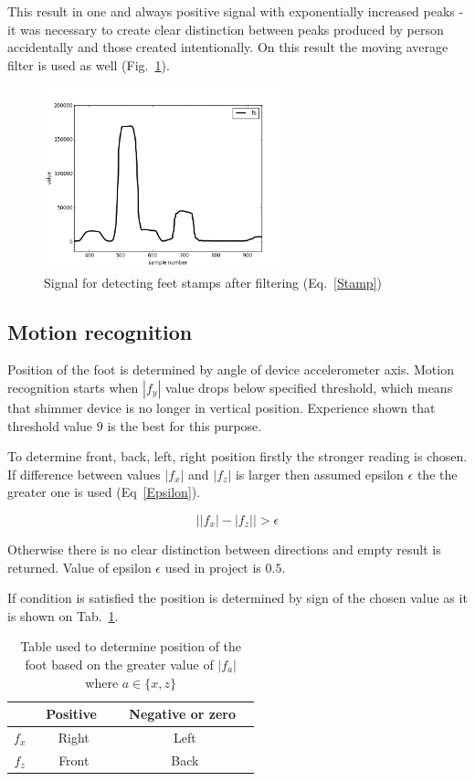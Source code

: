 \documentclass[conference]{IEEEtran}
\begin{document}
This result in one and always positive signal with exponentially increased peaks - it was necessary to create clear distinction between peaks produced by person accidentally and those created intentionally.
On this result the moving average filter is used as well (Fig.~\ref{fig:StampFiltered}).

\begin{figure}[!h]
    \centering
    \includegraphics[width=7cm]{Images/StampFiltered.png}
    \caption{Signal for detecting feet stamps after filtering (Eq.~\ref{Stamp})}
    \label{fig:StampFiltered}
\end{figure}

\subsection{Motion recognition}

Position of the foot is determined by angle of device accelerometer axis.
Motion recognition starts when $|f_y|$ value drops below specified threshold, which means that shimmer device is no longer in vertical position. Experience shown that threshold value $9$ is the best for this purpose.

To determine front, back, left, right position firstly the stronger reading is chosen.
If difference between values $|f_x|$ and $|f_z|$ is larger then assumed epsilon $\epsilon$ the the greater one is used (Eq~\ref{Epsilon}).

\begin{equation}
    \left||f_x| - |f_z|\right| > \epsilon
    \label{Epsilon}
\end{equation}

Otherwise there is no clear distinction between directions and empty result is returned.
Value of epsilon $\epsilon$ used in project is $0.5$.

If condition is satisfied the position is determined by sign of the chosen value as it is shown on Tab.~\ref{Directions}.

\begin{table}[h!]
	\caption{Table used to determine position of the foot based on the greater value of $|f_a|$ where $a \in \{x, z\}$}
	\begin{center}
		\begin{tabular}{c|cc}
			& \ Positive \ &\ Negative or zero \ \\
			\hline
			$f_x$&Right&Left\\
			$f_z$&Front&Back\\
		\end{tabular}
		\label{Directions}
	\end{center}
\end{table}
\end{document}
